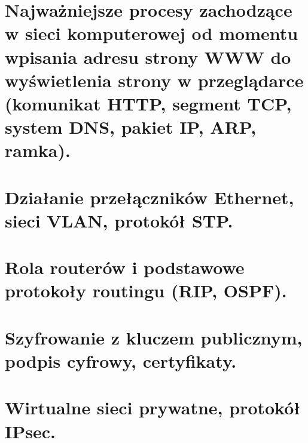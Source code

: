 \documentclass[12pt]{article}
\begin{document}
    \newpage

    \section{Najważniejsze procesy zachodzące w sieci komputerowej od momentu wpisania adresu strony WWW do wyświetlenia strony w przeglądarce (komunikat HTTP, segment TCP, system DNS, pakiet IP, ARP, ramka).}
    \section{Działanie przełączników Ethernet, sieci VLAN, protokół STP.}
    \section{Rola routerów i podstawowe protokoły routingu (RIP, OSPF).}
    \section{Szyfrowanie z kluczem publicznym, podpis cyfrowy, certyfikaty.}
    \section{Wirtualne sieci prywatne, protokół IPsec.}
\end{document}
